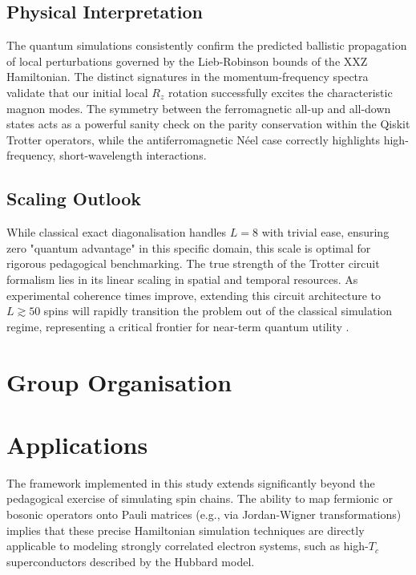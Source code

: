 \documentclass[11pt,a4paper]{article}
\begin{document}
\subsection{Physical Interpretation}
The quantum simulations consistently confirm the predicted ballistic propagation of local perturbations governed by the Lieb-Robinson bounds of the XXZ Hamiltonian. The distinct signatures in the momentum-frequency spectra validate that our initial local $R_z$ rotation successfully excites the characteristic magnon modes. The symmetry between the ferromagnetic all-up and all-down states acts as a powerful sanity check on the parity conservation within the Qiskit Trotter operators, while the antiferromagnetic N\'eel case correctly highlights high-frequency, short-wavelength interactions.

\subsection{Scaling Outlook}
While classical exact diagonalisation handles $L=8$ with trivial ease, ensuring zero "quantum advantage" in this specific domain, this scale is optimal for rigorous pedagogical benchmarking. The true strength of the Trotter circuit formalism lies in its linear scaling in spatial and temporal resources. As experimental coherence times improve, extending this circuit architecture to $L \gtrsim 50$ spins will rapidly transition the problem out of the classical simulation regime, representing a critical frontier for near-term quantum utility \cite{Kim2023}.

\section{Group Organisation} \label{sec:group}

\section{Applications} \label{sec:applications}

The framework implemented in this study extends significantly beyond the pedagogical exercise of simulating spin chains. The ability to map fermionic or bosonic operators onto Pauli matrices (e.g., via Jordan-Wigner transformations) implies that these precise Hamiltonian simulation techniques are directly applicable to modeling strongly correlated electron systems, such as high-$T_c$ superconductors described by the Hubbard model.
\end{document}

